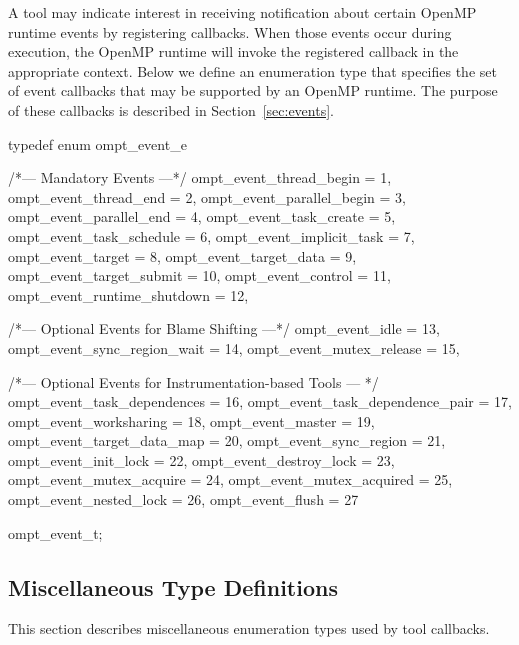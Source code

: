 \documentclass{article}
\begin{document}
A tool may indicate interest in receiving notification about certain OpenMP runtime events by registering callbacks. 
When those events occur during execution, the OpenMP runtime will invoke the registered callback in the appropriate context.
Below we define an enumeration type that specifies the set of event callbacks that may be supported by an OpenMP runtime. 
The purpose of these callbacks is described in Section~\ref{sec:events}. 

\begin{boxedcode}
typedef enum ompt\_event\_e {  
  /*--- Mandatory Events ---*/
  ompt\_event\_thread\_begin             = 1,
  ompt\_event\_thread\_end               = 2,
  ompt\_event\_parallel\_begin           = 3,
  ompt\_event\_parallel\_end             = 4,
  ompt\_event\_task\_create              = 5,
  ompt\_event\_task\_schedule            = 6,
  ompt\_event\_implicit\_task            = 7,
  ompt\_event\_target                   = 8,
  ompt\_event\_target\_data              = 9,
  ompt\_event\_target\_submit            = 10,
  ompt\_event\_control                  = 11,
  ompt\_event\_runtime\_shutdown         = 12,

  /*--- Optional Events for Blame Shifting ---*/
  ompt\_event\_idle                     = 13,
  ompt\_event\_sync\_region\_wait         = 14,
  ompt\_event\_mutex\_release            = 15,

  /*--- Optional Events for Instrumentation-based Tools --- */
  ompt\_event\_task\_dependences         = 16,
  ompt\_event\_task\_dependence\_pair     = 17,
  ompt\_event\_worksharing              = 18,
  ompt\_event\_master                   = 19,
  ompt\_event\_target\_data\_map          = 20,
  ompt\_event\_sync\_region              = 21,
  ompt\_event\_init\_lock                = 22,
  ompt\_event\_destroy\_lock             = 23,
  ompt\_event\_mutex\_acquire            = 24,
  ompt\_event\_mutex\_acquired           = 25,
  ompt\_event\_nested\_lock              = 26,
  ompt\_event\_flush                    = 27
} ompt\_event\_t;
\end{boxedcode}

\clearpage  
\subsection{Miscellaneous Type Definitions}
\label{appendix:ompt-types:misc}
This section describes miscellaneous enumeration types used by tool callbacks.
\end{document}
